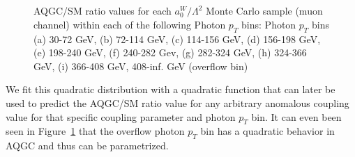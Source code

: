 \begin{figure}[]
\begin{center}
{  }\\
    \\
    \caption{AQGC/SM ratio values for each $a_{0}^{W}/\Lambda^{2}$ Monte Carlo sample (muon channel) within each of the following Photon $p_{T}$ bins: Photon $p_{T}$ bins (a) 30-72 GeV, (b) 72-114 GeV, (c) 114-156 GeV, (d) 156-198 GeV, (e) 198-240 GeV, (f) 240-282 Gev, (g) 282-324 GeV, (h) 324-366 GeV, (i) 366-408 GeV, 408-inf. GeV (overflow bin)}
  \label{fig:para_ptbins}
  \end{center}
\end{figure}

We fit this quadratic distribution with a quadratic function that can later 
be used to predict the AQGC/SM ratio value for any arbitrary anomalous 
coupling value for that specific coupling parameter and photon $p_{T}$ bin. 
It can even been seen in Figure~\ref{fig:para_ptbins} that the overflow 
photon $p_{T}$ bin has a quadratic behavior in AQGC and thus can be 
parametrized.  

